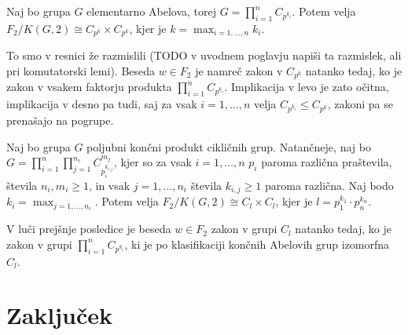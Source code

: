 \documentclass[mat1, tisk]{fmfdelo}
\numberwithin{equation}{section}  %
\begin{document}
\begin{posledica}
\label{psl_lastnosti_zakonov_elementarno_abelove}
Naj bo grupa $G$ elementarno Abelova, torej $G = \prod_{i = 1}^{n} C_{p^{k_{i}}}$. Potem velja $F_2 / K(G, 2) \cong C_{p^{k}} \times C_{p^{k}}$, kjer je $k = \max_{i = 1 , \ldots , n} k_i$.
\end{posledica}
\begin{dokaz}
To smo v resnici že razmislili (TODO v uvodnem poglavju napiši ta razmislek, ali pri komutatorski lemi). 
Beseda $w \in F_2$ je namreč zakon v $C_{p^{k}}$ natanko tedaj, ko je zakon v vsakem faktorju produkta $\prod_{i = 1}^{n} C_{p^{k_{i}}}$. Implikacija v levo je zato očitna, implikacija v desno pa tudi,
saj za vsak $i = 1 , \ldots , n$ velja $C_{p^{k_{i}}} \le C_{p^{k}}$, zakoni pa se prenašajo na pogrupe.
\end{dokaz}

\begin{posledica}
\label{psl_lastnosti_zakonov_splosni_produkti_ciklicnih}
Naj bo grupa $G$ poljubni končni produkt cikličnih grup. Natančneje, naj bo $G = \prod_{i = 1}^{n} \prod_{j = 1}^{n_i} C_{p_{i}^{k_{i,j}}}^{m_j}$, kjer so za vsak $i = 1, \ldots, n$ $p_i$ paroma različna praštevila, števila $n_i, m_{i} \ge 1$, in vsak $j = 1, \ldots , n_i$ števila $k_{i, j} \ge 1$ paroma različna. %
Naj bodo $k_i = \max_{j = 1, \ldots, n_i}$. Potem velja $F_2 / K(G, 2) \cong C_{l} \times C_{l}$, kjer je $l = p_1^{k_1} \cdot p_n^{k_n}$.
\end{posledica}
\begin{dokaz}
V luči prejšnje posledice je beseda $w \in F_2$ zakon v grupi $C_l$ natanko tedaj, ko je zakon v grupi $\prod_{i = 1}^{n} C_{p^{k_i}}$, ki je po klasifikaciji končnih Abelovih grup izomorfna $C_l$.
\end{dokaz}








\section{Zaključek}
\end{document}
